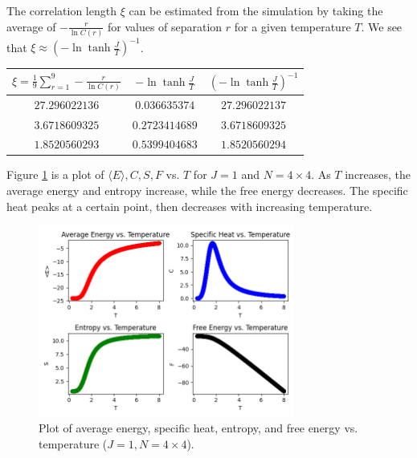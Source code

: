 \documentclass{article}
\begin{document}
\clearpage

\problem
The correlation length $\xi$ can be estimated from the simulation by taking the average of $-\frac{r}{\ln C\left(r\right)}$ for values of separation $r$ for a given temperature $T$. We see that $\xi \approx {\left(-\ln\tanh\frac{J}{T}\right)}^{-1}$.
\begin{center}
    \begin{tabular}{|c|c|c|}
        \hline
        $\xi = \frac{1}{9}\sum_{r=1}^{9} -\frac{r}{\ln C(r)}$ & $-\ln\tanh\frac{J}{T}$ & ${\left(-\ln\tanh\frac{J}{T}\right)}^{-1}$ \\
        \hline
        $27.296022136$ & 
        $0.036635374$ &
        $27.296022137$\\
        \hline
        $3.6718609325$ & 
        $0.2723414689$ & 
        $3.6718609325$ \\
        \hline
        $1.8520560293$ & 
        $0.5399404683$ & 
        $1.8520560294$ \\
        \hline
    \end{tabular}
\end{center}

\clearpage

\problem
Figure \ref{fig:fig2} is a plot of $\langle E \rangle, C, S, F$ vs. $T$ for $J = 1$ and $N = 4 \times 4$. As $T$ increases, the average energy and entropy increase, while the free energy decreases. The specific heat peaks at a certain point, then decreases with increasing temperature.
\begin{figure}[!htb]
    \centering
    \includegraphics[width=0.75\textwidth]{../code/phy112l_lab4/4-7.png}
    \caption{Plot of average energy, specific heat, entropy, and free energy vs. temperature ($J = 1, N = 4 \times 4$).}
    \label{fig:fig2}
\end{figure}
\end{document}
